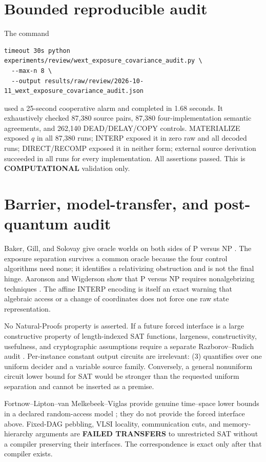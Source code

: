 \documentclass[11pt]{article}
\begin{document}
\section{Bounded reproducible audit}
The command
\begin{verbatim}
timeout 30s python experiments/review/wext_exposure_covariance_audit.py \
  --max-n 8 \
  --output results/raw/review/2026-10-11_wext_exposure_covariance_audit.json
\end{verbatim}
used a 25-second cooperative alarm and completed in 1.68 seconds.  It
exhaustively checked 87,380 source pairs, 87,380 four-implementation semantic
agreements, and 262,140 DEAD/DELAY/COPY controls.  MATERIALIZE exposed $q$ in
all 87,380 runs; INTERP exposed it in zero raw and all decoded runs;
DIRECT/RECOMP exposed it in neither form; external source derivation succeeded
in all runs for every implementation.  All assertions passed.  This is
\textbf{COMPUTATIONAL} validation only.

\section{Barrier, model-transfer, and post-quantum audit}
Baker, Gill, and Solovay give oracle worlds on both sides of P versus NP
\cite{bgs}.  The exposure separation survives a common oracle because the
four control algorithms need none; it identifies a relativizing obstruction
and is not the final hinge.  Aaronson and Wigderson show that P versus NP
requires nonalgebrizing techniques \cite{aw}.  The affine INTERP encoding is
itself an exact warning that algebraic access or a change of coordinates does
not force one raw state representation.

No Natural-Proofs property is asserted.  If a future forced interface is a
large constructive property of length-indexed SAT functions, largeness,
constructivity, usefulness, and cryptographic assumptions require a separate
Razborov--Rudich audit \cite{rr}.  Per-instance constant output circuits are
irrelevant: (3) quantifies over one uniform decider and a variable source
family.  Conversely, a general nonuniform circuit lower bound for SAT would
be stronger than the requested uniform separation and cannot be inserted as
a premise.

Fortnow--Lipton--van Melkebeek--Viglas provide genuine time--space lower
bounds in a declared random-access model \cite{flmv}; they do not provide
the forced interface above.  Fixed-DAG pebbling, VLSI locality, communication
cuts, and memory-hierarchy arguments are \textbf{FAILED TRANSFERS} to
unrestricted SAT without a compiler preserving their interfaces.  The
correspondence is exact only after that compiler exists.
\end{document}
